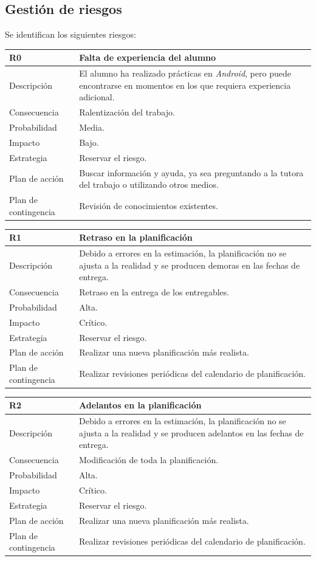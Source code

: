 \documentclass[twoside]{report}
\newcommand\addrow[2]{#1 &#2\\ }
\newcommand\addheading[2]{#1 &#2\\ \hline}
\newcommand\tabularhead{\begin{tabular}{lp{0.7\textwidth}}
\hline
}
\newenvironment{risk}{\tabularhead}
{\hline\end{tabular}}
\begin{document}
\subsection{Gestión de riesgos}

Se identifican los siguientes riesgos:

\begin{risk}
  \addheading{R0}{Falta de experiencia del alumno}
  \addrow{Descripción}{El alumno ha realizado prácticas en \textit{Android}, pero puede encontrarse en momentos en los que requiera experiencia adicional.}
  \addrow{Consecuencia}{Ralentización del trabajo.}
  \addrow{Probabilidad}{Media.}
  \addrow{Impacto}{Bajo.}
  \addrow{Estrategia}{Reservar el riesgo.}
  \addrow{Plan de acción}{Buscar información y ayuda, ya sea preguntando a la tutora del trabajo o utilizando otros medios.}
  \addrow{Plan de contingencia}{Revisión de conocimientos existentes.}
\end{risk}

\vspace{0.5cm}

\begin{risk}
  \addheading{R1}{Retraso en la planificación}
  \addrow{Descripción}{Debido a errores en la estimación, la planificación no se ajusta a la realidad y se producen demoras en las fechas de entrega.}
  \addrow{Consecuencia}{Retraso en la entrega de los entregables.}
  \addrow{Probabilidad}{Alta.}
  \addrow{Impacto}{Crítico.}
  \addrow{Estrategia}{Reservar el riesgo.}
  \addrow{Plan de acción}{Realizar una nueva planificación más realista. }
  \addrow{Plan de contingencia}{Realizar revisiones periódicas del calendario de planificación.}
\end{risk}

\vspace{0.5cm}

\begin{risk}
  \addheading{R2}{Adelantos en la planificación}
  \addrow{Descripción}{Debido a errores en la estimación, la planificación no se ajusta a la realidad y se producen adelantos en las fechas de entrega.}
  \addrow{Consecuencia}{Modificación de toda la planificación.}
  \addrow{Probabilidad}{Alta.}
  \addrow{Impacto}{Crítico.}
  \addrow{Estrategia}{Reservar el riesgo.}
  \addrow{Plan de acción}{Realizar una nueva planificación más realista. }
  \addrow{Plan de contingencia}{Realizar revisiones periódicas del calendario de planificación.}
\end{risk}

\vspace{0.5cm}
\end{document}
